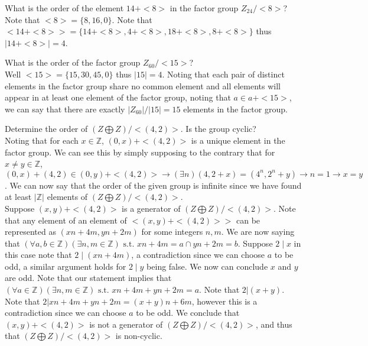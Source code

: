 \documentclass[12pt]{article}
\makeatletter
\theoremstyle{homework}
\newenvironment{exercise}[1]
{\def\@currentlabel{#1}\exercisecore}
{\endexercisecore}
\makeatother
\begin{document}
\begin{exercise}{9.14}
What is the order of the element $14 + <8>$ in the factor group $Z_{24} /<8>$?\\
Note that $<8>=\{8,16,0\}$.  Note that $<14+<8>>=\{14+<8>,4+<8>,18+<8>,8+<8>\}$ thus $|14+<8>|=4$.
\end{exercise}

\begin{exercise}{9.18}
What is the order of the factor group $Z_{60} /<15>$?\\
Well $<15>=\{15,30,45,0\}$ thus $|15|=4$.  Noting that each pair of distinct elements in the factor group share no common element and all elements will appear in at least one element of the factor group, noting that $a\in a+<15>$, we can say that there are exactly $|Z_{60}|/|15|=15$ elements in the factor group.
\end{exercise}

\begin{exercise}{9.23}
Determine the order of $(Z \bigoplus Z)/<(4, 2)>$. Is the group cyclic?\\
Noting that for each $x\in\mathbb{Z}$, $(0,x)+<(4,2)>$ is a unique element in the factor group.  We can see this by simply supposing to the contrary that for $x\neq y\in\mathbb{Z}$, $(0,x)+(4,2)\in (0,y)+<(4,2)>\rightarrow (\exists n) (4,2+x)=(4^n,2^n+y)\rightarrow n=1\rightarrow x=y$.  We can now say that the order of the given group is infinite since we have found at least $|\mathbb{Z}|$ elements of $(Z \bigoplus Z)/<(4, 2)>$.\\
Suppose $(x,y)+<(4,2)>$ is a generator of $(Z \bigoplus Z)/<(4, 2)>$.  Note that any element of an element of $<(x,y)+<(4,2)>>$ can be represented as $(xn+4m,yn+2m)$ for some integers $n,m$. We are now saying that $(\forall a,b\in\mathbb{Z}) (\exists n,m\in\mathbb{Z}) \text{ s.t. } xn+4m=a\cap yn+2m=b$.  Suppose $2\mid x$ in this case note that $2\mid (xn+4m)$, a contradiction since we can choose $a$ to be odd, a similar argument holds for $2\mid y$ being false.  We now can conclude $x$ and $y$ are odd.  Note that our statement implies that $(\forall a\in\mathbb{Z}) (\exists n,m\in\mathbb{Z}) \text{ s.t. } xn+4m+ yn+2m=a$.  Note that $2|(x+y)$.  Note that $2|xn+4m+ yn+2m=(x+y)n+6m$, however this is a contradiction since we can choose $a$ to be odd.  We conclude that $(x,y)+<(4,2)>$ is not a generator of $(Z \bigoplus Z)/<(4, 2)>$, and thus that $(Z \bigoplus Z)/<(4, 2)>$ is non-cyclic.
\end{exercise}
\end{document}
